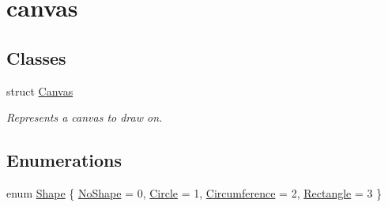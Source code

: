 \hypertarget{group__canvas}{}\section{canvas}
\label{group__canvas}
\subsection*{Classes}
\begin{DoxyCompactItemize}
\item 
struct \mbox{\hyperlink{struct_canvas}{Canvas}}
\begin{DoxyCompactList}\small\item\em Represents a canvas to draw on. \end{DoxyCompactList}\end{DoxyCompactItemize}
\subsection*{Enumerations}
\begin{DoxyCompactItemize}
\item 
enum \mbox{\hyperlink{group__canvas_ga55b506070847a13554f8b879c1bfb37c}{Shape}} \{ \mbox{\hyperlink{group__canvas_gga55b506070847a13554f8b879c1bfb37ca3f73020bb3eee4324fe1181b5a500873}{No\+Shape}} = 0, 
\mbox{\hyperlink{group__canvas_gga55b506070847a13554f8b879c1bfb37cad3ce82743a8255ccd69f5b67d257c489}{Circle}} = 1, 
\mbox{\hyperlink{group__canvas_gga55b506070847a13554f8b879c1bfb37ca65b3bc9ab39ffbf46ba5a60a0f696060}{Circumference}} = 2, 
\mbox{\hyperlink{group__canvas_gga55b506070847a13554f8b879c1bfb37cad614565f121617f9b952559339bffcf6}{Rectangle}} = 3
 \}
\end{DoxyCompactItemize}

